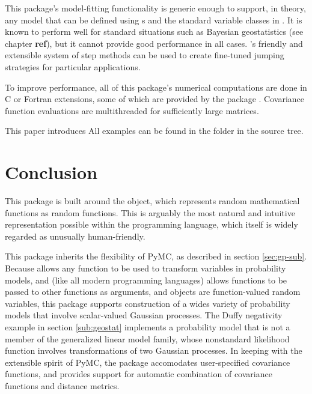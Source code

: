 \documentclass[article]{jss}
\begin{document}
This package's model-fitting functionality is generic enough to support, in theory, any model that can be defined using s and the standard variable classes in . It is known to perform well for standard situations such as Bayesian geostatistics (see chapter \textbf{ref}), but it cannot provide good performance in all cases. 's friendly and extensible system of step methods can be used to create fine-tuned jumping strategies for particular applications.

To improve performance, all of this package's numerical computations are done in C or Fortran extensions, some of which are provided by the  package \citep{numpybook}. Covariance function evaluations are multithreaded for sufficiently large matrices.

\medskip
This paper introduces  All examples can be found in the folder  in the  source tree.

 



\section{Conclusion}

This package is built around the  object, which represents random mathematical functions as random  functions. This is arguably the most natural and intuitive representation possible within the  programming language, which itself is widely regarded as unusually human-friendly.

This package inherits the flexibility of PyMC, as described in section \ref{sec:gp-sub}. Because  allows any  function to be used to transform variables in probability models, and  (like all modern programming languages) allows functions to be passed to other functions as arguments, and  objects are function-valued random variables, this package supports construction of a wides variety of probability models that involve scalar-valued Gaussian processes. The Duffy negativity example in section \ref{sub:geostat} implements a probability model that is not a member of the generalized linear model family, whose nonstandard likelihood function involves transformations of two Gaussian processes. In keeping with the extensible spirit of PyMC, the package accomodates user-specified covariance functions, and provides support for automatic combination of covariance functions and distance metrics.
\end{document}
